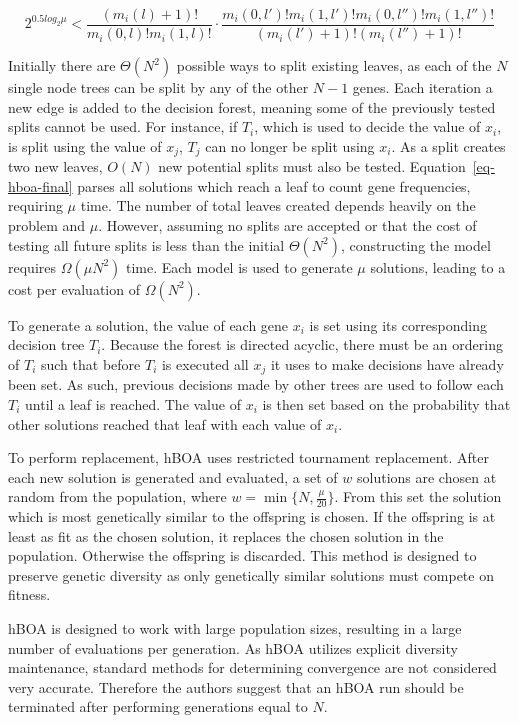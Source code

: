 \documentclass[twoside]{article}
\begin{document}
\begin{equation}
  2^{0.5 log_2\mu} < \frac{(m_i(l) + 1)!}{m_i(0, l)!m_i(1,l)!} \cdot
  \frac{m_i(0, l')!m_i(1,l')!m_i(0, l'')!m_i(1,l'')!}{(m_i(l') + 1)!(m_i(l'') + 1)!}
  \label{eq-hboa-final}
\end{equation}

Initially there are $\Theta(N^2)$ possible ways to split existing leaves, as each of the $N$ single node
trees can be split by any of the other $N-1$ genes. Each iteration a new edge is added to the decision
forest, meaning some of the previously tested splits cannot be used. For instance, if $T_i$, which is used
to decide the value of $x_i$, is split using the value of $x_j$, $T_j$ can no longer be split using $x_i$.
As a split creates two new leaves, $O(N)$ new potential splits must also be tested. Equation~\ref{eq-hboa-final}
parses all solutions which reach a leaf to count gene frequencies, requiring $\mu$ time.
The number of total leaves created depends heavily on the problem and $\mu$.
However, assuming no splits are accepted or that the cost of testing all future splits is less than
the initial $\Theta(N^2)$, constructing the model requires $\Omega(\mu N^2)$ time. Each
model is used to generate $\mu$ solutions, leading to a cost per evaluation of $\Omega(N^2)$.

To generate a solution, the value of each gene $x_i$ is set using its corresponding decision tree $T_i$. Because
the forest is directed acyclic, there must be an ordering of $T_i$ such that before $T_i$ is executed all
$x_j$ it uses to make decisions have already been set. As such, previous decisions made by other trees
are used to follow each $T_i$ until a leaf is reached. The value of $x_i$ is then set based on the
probability that other solutions reached that leaf with each value of $x_i$.

To perform replacement, hBOA uses restricted tournament replacement. After each new solution is generated
and evaluated, a set of $w$ solutions are chosen at random from the population, where $w=\min\{N, \frac{\mu}{20}\}$.
From this set the solution which is most genetically similar to the offspring is chosen. If the offspring
is at least as fit as the chosen solution, it replaces the chosen solution in the population. Otherwise the
offspring is discarded. This method is designed to preserve genetic diversity as only genetically similar
solutions must compete on fitness.

hBOA is designed to work with large population sizes, resulting in a large number of
evaluations per generation. As hBOA utilizes explicit diversity maintenance, standard methods for determining
convergence are not considered very accurate. Therefore the authors suggest that an hBOA run should be
terminated after performing generations equal to $N$.
\end{document}
